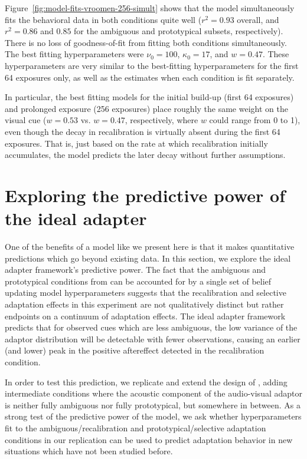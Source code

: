 Figure~\ref{fig:model-fits-vroomen-256-simult} shows that the model simultaneously fits the behavioral data in both conditions quite well ($r^2=0.93$ overall, and $r^2=0.86$ and $0.85$ for the ambiguous and prototypical subsets, respectively).  There is no loss of goodness-of-fit from fitting both conditions simultaneously.  The best fitting hyperparameters were $\nu_0 = 100$, $\kappa_0=17$, and $w=0.47$.  These hyperparameters are very similar to the best-fitting hyperparameters for the first 64 exposures only, as well as the estimates when each condition is fit separately.

In particular, the best fitting models for the initial build-up (first 64 exposures) and prolonged exposure (256 exposures) place roughly the same weight on the visual cue ($w=0.53$ vs. $w=0.47$, respectively, where $w$ could range from 0 to 1), even though the decay in recalibration is virtually absent during the first 64 exposures. That is, just based on the rate at which recalibration initially accumulates, the model predicts the later decay without further assumptions.


\section{Exploring the predictive power of the ideal adapter}
\label{sec:expl-pred-power}

One of the benefits of a model like we present here is that it makes quantitative predictions which go beyond existing data.  In this section, we explore the ideal adapter framework's predictive power.  The fact that the ambiguous and prototypical conditions from \textcite{Vroomen2007} can be accounted for by a single set of belief updating model hyperparameters suggests that the recalibration and selective adaptation effects in this experiment are not qualitatively distinct but rather endpoints on a continuum of adaptation effects.  The ideal adapter framework predicts that for observed cues which are less ambiguous, the low variance of the adaptor distribution will be detectable with fewer observations, causing an earlier (and lower) peak in the positive aftereffect detected in the recalibration condition.


In order to test this prediction, we replicate and extend the design of \textcite{Vroomen2007}, adding intermediate conditions where the acoustic component of the audio-visual adaptor is neither fully ambiguous nor fully prototypical, but somewhere in between.  As a strong test of the predictive power of the model, we ask whether hyperparameters fit to the ambiguous/recalibration and prototypical/selective adaptation conditions in our replication can be used to predict adaptation behavior in new situations which have not been studied before.

